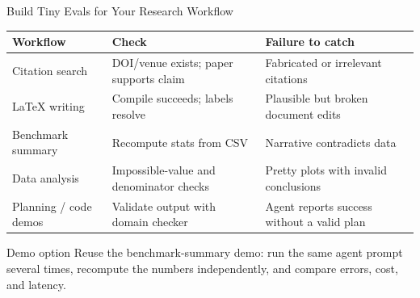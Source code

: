 \begin{frame}[shrink=5]{Build Tiny Evals for Your Research Workflow}
  \small
  \begin{tabularx}{\textwidth}{p{} X X}
    \toprule
    \textbf{Workflow} & \textbf{Check} & \textbf{Failure to catch} \\
    \midrule
    Citation search & DOI/venue exists; paper supports claim & Fabricated or irrelevant citations \\
    LaTeX writing & Compile succeeds; labels resolve & Plausible but broken document edits \\
    Benchmark summary & Recompute stats from CSV & Narrative contradicts data \\
    Data analysis & Impossible-value and denominator checks & Pretty plots with invalid conclusions \\
    Planning / code demos & Validate output with domain checker & Agent reports success without a valid plan \\
    \bottomrule
  \end{tabularx}
  \vspace{0.35em}
  \begin{block}{Demo option}
    Reuse the benchmark-summary demo: run the same agent prompt several times, recompute the numbers independently, and compare errors, cost, and latency.
  \end{block}
\end{frame}

